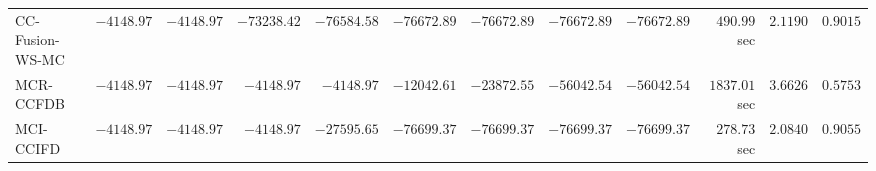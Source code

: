 \begin{table}[H]
\begin{tabular}{lrrrrrrrrrrr}
     CC-Fusion-WS-MC & $     -4148.97$ & $     -4148.97$ & $    -73238.42$ & $    -76584.58$ & $    -76672.89$ & $    -76672.89$ & $    -76672.89$ & $    -76672.89$ & $       490.99$ sec    & $       2.1190$  & $       0.9015$ \\ 
\cmidrule{1-1} 
           MCR-CCFDB & $     -4148.97$ & $     -4148.97$ & $     -4148.97$ & $     -4148.97$ & $    -12042.61$ & $    -23872.55$ & $    -56042.54$ & $    -56042.54$ & $      1837.01$ sec    & $       3.6626$  & $       0.5753$ \\ 
\cmidrule{1-1} 
           MCI-CCIFD & $     -4148.97$ & $     -4148.97$ & $     -4148.97$ & $    -27595.65$ & $    -76699.37$ & $    -76699.37$ & $    -76699.37$ & $    -76699.37$ & $       278.73$ sec    & $       2.0840$  & $       0.9055$ \\ 
\bottomrule
\end{tabular}
\end{table}

